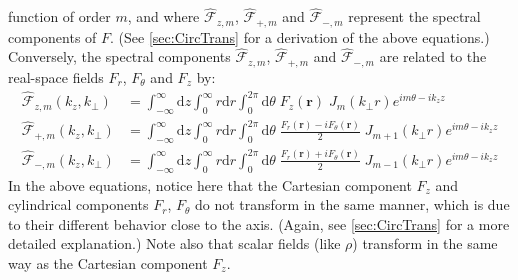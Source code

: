 \documentclass[1p,times]{elsarticle}
\newcommand{\Integ}[1]{\int_{-\infty}^{\infty} \!\!\!\!\!\!
  \mathrm{d}#1}
\newcommand{\RInteg}[1]{\int_{0}^{\infty} \!\!\!\!\! #1\mathrm{d}#1}
\newcommand{\TInteg}[1]{\int_{0}^{2\pi} \!\!\!\!\!\! \mathrm{d}#1}
\renewcommand{\vec}[1]{\boldsymbol{#1}}
\newcommand{\spectral}[1]{\hat{\mathcal{#1}}}
\begin{document}
function of order $m$, and where $\spectral{F}_{z,m}$, $\spectral{F}_{+,m}$ and
 $\spectral{F}_{-,m}$ represent the spectral components of $F$. (See
\ref{sec:CircTrans} for a derivation of the above equations.)
Conversely, the spectral components $\spectral{F}_{z,m}$, $\spectral{F}_{+,m}$ and
 $\spectral{F}_{-,m}$ are related to the real-space fields $F_r$,
 $F_\theta$ and $F_z$ by:
\begin{subequations}
\begin{align}
\spectral{F}_{z,m}(k_z,k_\perp ) &= \Integ{z} \RInteg{r}
\TInteg{\theta} \;F_z(\vec{r})\; J_m(k_\perp r) e^{im\theta
 - i k_z z} \label{eq:CircFwTransz} \\
\spectral{F}_{+,m}(k_z,k_\perp ) &= \Integ{z} \RInteg{r}
\TInteg{\theta} \;\frac{F_r (\vec{r})-iF_\theta (\vec{r})}{2}\; J_{m+1}(k_\perp r) e^{im\theta
 - i k_z z} \label{eq:CircFwTransp} \\
\spectral{F}_{-,m}(k_z,k_\perp ) &= \Integ{z} \RInteg{r}
\TInteg{\theta} \;\frac{F_r (\vec{r})+iF_\theta(\vec{r})}{2}\; J_{m-1}(k_\perp r) e^{im\theta
 - i k_z z} \label{eq:CircFwTransm} 
\end{align}
\end{subequations}
\noindent In the above equations, notice here that the Cartesian
component $F_z$ and cylindrical components
$F_r$, $F_\theta$ do not transform in the same manner, which is due
to their different behavior close to the axis. (Again, see
\ref{sec:CircTrans} for a more detailed explanation.)
Note also that scalar fields (like $\rho$) transform in the
same way as the Cartesian component $F_z$. 
\end{document}
